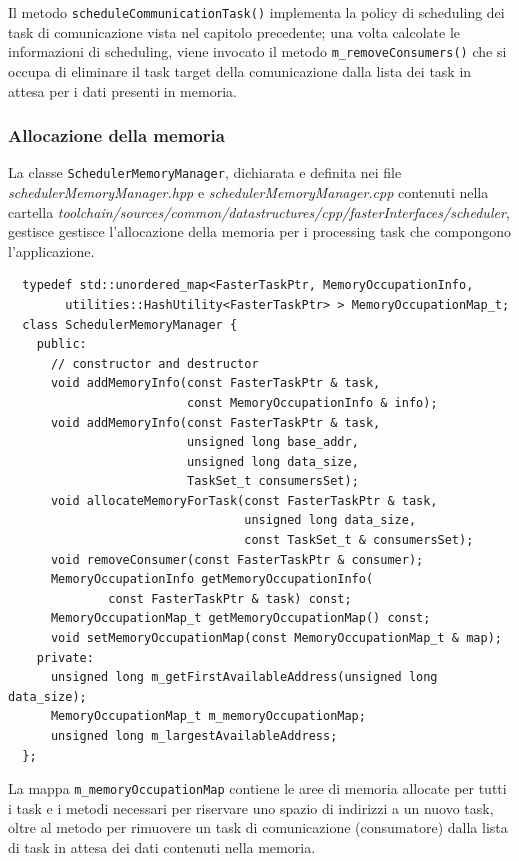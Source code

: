 Il metodo \verb+scheduleCommunicationTask()+ implementa la policy di scheduling dei
task di comunicazione vista nel capitolo precedente; una volta calcolate le informazioni
di scheduling, viene invocato il metodo \verb+m_removeConsumers()+ che si occupa di
eliminare il task target della comunicazione dalla lista dei task in attesa per
i dati presenti in memoria.

\subsubsection{Allocazione della memoria}
La classe \verb+SchedulerMemoryManager+, dichiarata e definita nei file
\emph{schedulerMemoryManager.hpp} e \emph{schedulerMemoryManager.cpp} contenuti nella cartella
\emph{toolchain/sources/common/datastructures/cpp/fasterInterfaces/scheduler}, gestisce
gestisce l'allocazione della memoria per i processing task che compongono l'applicazione.
\newline
\begin{verbatim}
  typedef std::unordered_map<FasterTaskPtr, MemoryOccupationInfo,
        utilities::HashUtility<FasterTaskPtr> > MemoryOccupationMap_t;
  class SchedulerMemoryManager {
    public:
      // constructor and destructor
      void addMemoryInfo(const FasterTaskPtr & task,
                         const MemoryOccupationInfo & info);
      void addMemoryInfo(const FasterTaskPtr & task,
                         unsigned long base_addr,
                         unsigned long data_size,
                         TaskSet_t consumersSet);
      void allocateMemoryForTask(const FasterTaskPtr & task,
                                 unsigned long data_size,
                                 const TaskSet_t & consumersSet);
      void removeConsumer(const FasterTaskPtr & consumer);
      MemoryOccupationInfo getMemoryOccupationInfo(
              const FasterTaskPtr & task) const;
      MemoryOccupationMap_t getMemoryOccupationMap() const;
      void setMemoryOccupationMap(const MemoryOccupationMap_t & map);
    private:
      unsigned long m_getFirstAvailableAddress(unsigned long data_size);          
      MemoryOccupationMap_t m_memoryOccupationMap;          
      unsigned long m_largestAvailableAddress;
  };
\end{verbatim}

La mappa \verb+m_memoryOccupationMap+ contiene le aree di memoria allocate per tutti i
task e i metodi necessari per riservare uno spazio di indirizzi a un nuovo task, oltre
al metodo per rimuovere un task di comunicazione (consumatore) dalla lista di task in
attesa dei dati contenuti nella memoria.
